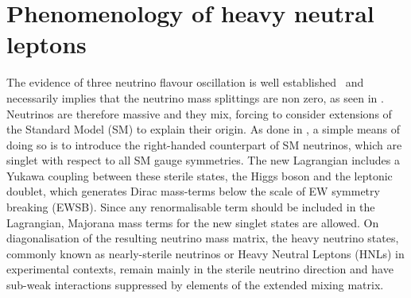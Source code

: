\clearpage
\chapter{Phenomenology of heavy neutral leptons}
\label{cha:mass_models}

The evidence of three neutrino flavour oscillation is well established~\cite{Fukuda:1998mi,Aharmim:2005gt, Esteban:2018azc} %
and necessarily implies that the neutrino mass splittings are non zero, as seen in .
Neutrinos are therefore massive and they mix, forcing to consider extensions of the Standard Model (SM) to explain their origin. 
As done in , a simple means of doing so is to introduce the right-handed counterpart of SM neutrinos,
which are singlet with respect to all SM gauge symmetries.
The new Lagrangian includes a Yukawa coupling between these sterile states, the Higgs boson and the leptonic doublet, %
which generates Dirac mass-terms below the scale of EW symmetry breaking (EWSB).
Since any renormalisable term should be included in the Lagrangian, %
Majorana mass terms for the new singlet states are allowed.
On diagonalisation of the resulting neutrino mass matrix, the heavy neutrino states, %
commonly known as nearly-sterile neutrinos or Heavy Neutral Leptons (HNLs) in experimental contexts, %
remain mainly in the sterile neutrino direction and have sub-weak interactions suppressed by %
elements of the extended mixing matrix. 

